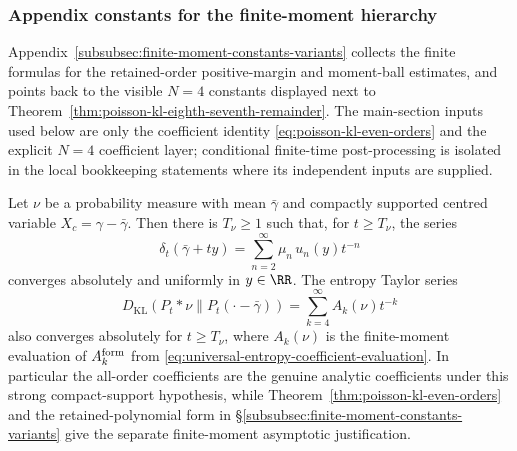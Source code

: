 \subsubsection{Appendix constants for the finite-moment hierarchy}%
\label{subsubsec:finite-moment-constant-pointer}

Appendix~\ref{subsubsec:finite-moment-constants-variants} collects the
finite formulas for the retained-order positive-margin and moment-ball
estimates, and points back to the visible \(N=4\) constants displayed next to
Theorem~\ref{thm:poisson-kl-eighth-seventh-remainder}.  The main-section
inputs used below are only the coefficient identity
\eqref{eq:poisson-kl-even-orders} and the explicit \(N=4\) coefficient
layer; conditional finite-time post-processing is isolated in
the local bookkeeping statements where its independent inputs are supplied.
\begin{theorem}%
\label{thm:analytic-compact-support-interchange}
Let $\nu$ be a probability measure with mean $\bar{\gamma}$ and compactly
supported centred variable $X_c=\gamma-\bar{\gamma}$.  Then there is
$T_\nu\ge1$ such that, for $t\ge T_\nu$, the series
\begin{equation}\label{eq:analytic-density-series}
\delta_t(\bar{\gamma}+ty)
=\sum_{n=2}^{\infty}\mu_n\,u_n(y)t^{-n}
\end{equation}
converges absolutely and uniformly in $y\in\RR$.  The entropy Taylor series
\begin{equation}\label{eq:analytic-entropy-series}
D_{\mathrm{KL}}(P_t*\nu\|P_t(\cdot-\bar{\gamma}))
=\sum_{k=4}^{\infty}A_k(\nu)t^{-k}
\end{equation}
also converges absolutely for $t\ge T_\nu$, where $A_k(\nu)$ is the
finite-moment evaluation of $A_k^{\rm form}$ from
\eqref{eq:universal-entropy-coefficient-evaluation}.  In particular the
all-order coefficients are the genuine analytic coefficients under this
strong compact-support hypothesis, while
Theorem~\ref{thm:poisson-kl-even-orders} and the retained-polynomial form in
\S\ref{subsubsec:finite-moment-constants-variants} give the separate
finite-moment asymptotic justification.
\end{theorem}

